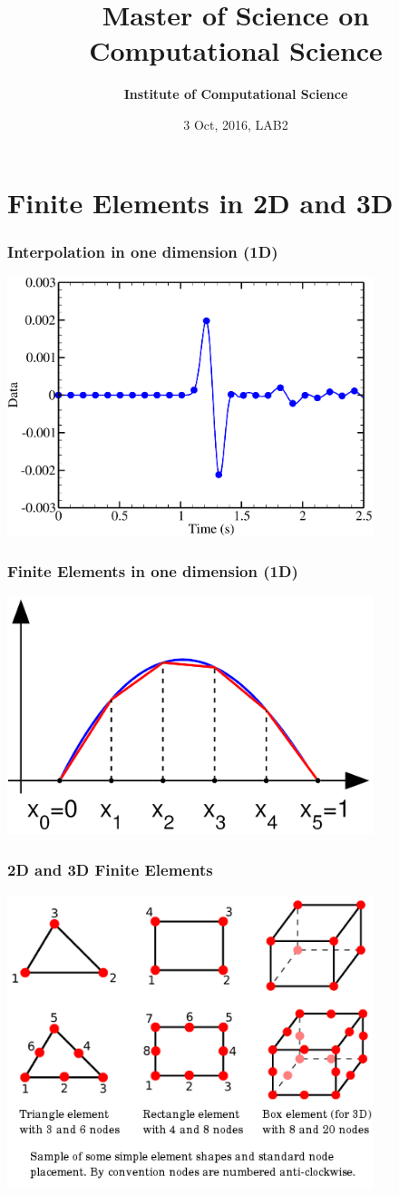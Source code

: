 \documentclass[handout]{beamer}
{
\usepackage{fullpage}
\usepackage{hyperref}
\usepackage{amssymb} 
}
\title[PDE LAB2, 2016]{Master of Science on Computational Science}
\author[Dr. Drosos Kourounis \& Hardik Kothari (TA)] %
{\textbf{Institute of Computational Science}}
\institute[ICS] %
{
Dr. Drosos Kourounis \& Hardik Kothari (TA)
}
\date[3 Oct,  2016]{3 Oct, 2016, LAB2}
\begin{document}
\begin{frame}
  \titlepage
\end{frame}

\section{Finite Elements in 2D and 3D}


\begin{frame}
\frametitle{Interpolation in one dimension (1D)}
\includegraphics[width=0.8\textwidth]{FEM1D.pdf}
\end{frame}

\begin{frame}
\frametitle{Finite Elements in one dimension (1D)}
\includegraphics[width=0.8\textwidth]{FiniteElements1D.png}
\end{frame}


\begin{frame}
\frametitle{2D and 3D Finite Elements}
\includegraphics[width=0.8\textwidth]{FiniteElements.png}
\end{frame}
\end{document}
